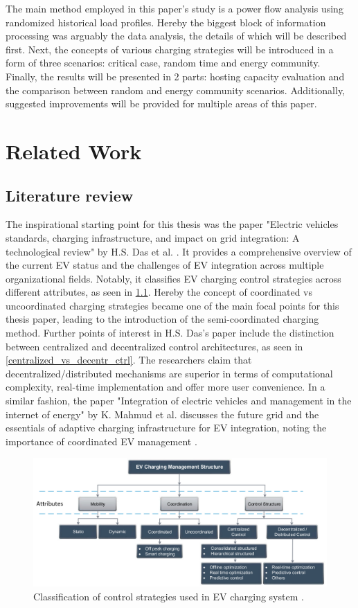 \documentclass[a4paper,10pt]{report}
\begin{document}
The main method employed in this paper's study is a power flow analysis using randomized historical load profiles. Hereby the biggest block of information processing was arguably the data analysis, the details of which will be described first. Next, the concepts of various charging strategies will be introduced in a form of three scenarios: critical case, random time and energy community. Finally, the results will be presented in 2 parts: hosting capacity evaluation and the comparison between random and energy community scenarios. Additionally, suggested improvements will be provided for multiple areas of this paper.


\chapter{Related Work}
\section{Literature review}\label{section_literature_review}
The inspirational starting point for this thesis was the paper "Electric vehicles standards, charging infrastructure, and impact on grid integration: A technological review" by H.S. Das et al. \cite{Das2020}. It provides a comprehensive overview of the current EV status and the challenges of EV integration across multiple organizational fields. Notably, it classifies EV charging control strategies across different attributes, as seen in \cref{control_strats_charging}. Hereby the concept of coordinated vs uncoordinated charging strategies became one of the main focal points for this thesis paper, leading to the introduction of the semi-coordinated charging method. Further points of interest in H.S. Das's paper include the distinction between centralized and decentralized control architectures, as seen in \cref{centralized_vs_decentr_ctrl}. The researchers claim that decentralized/distributed mechanisms are superior in terms of computational complexity, real-time implementation and offer more user convenience. In a similar fashion, the paper "Integration of electric vehicles and management in the internet of energy" by K. Mahmud et al. discusses the future grid and the essentials of adaptive charging infrastructure for EV integration, noting the importance of coordinated EV management \cite{Mahmud2018}.

\begin{figure}[htpb]
	\centering
	\includegraphics[width=\linewidth]{control_strats_charging}
	\caption[]{Classification of control strategies used in EV charging system \cite{Das2020}.}
	\label{control_strats_charging}
\end{figure}
\end{document}
